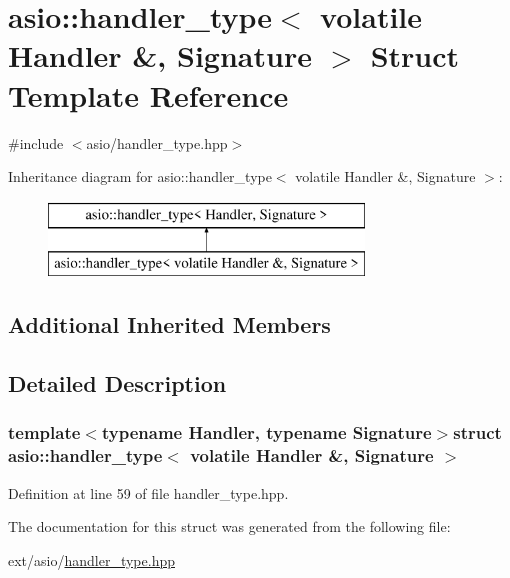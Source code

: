 \hypertarget{structasio_1_1handler__type_3_01volatile_01_handler_01_6_00_01_signature_01_4}{}\section{asio\+:\+:handler\+\_\+type$<$ volatile Handler \&, Signature $>$ Struct Template Reference}
\label{structasio_1_1handler__type_3_01volatile_01_handler_01_6_00_01_signature_01_4}


{\ttfamily \#include $<$asio/handler\+\_\+type.\+hpp$>$}

Inheritance diagram for asio\+:\+:handler\+\_\+type$<$ volatile Handler \&, Signature $>$\+:\begin{figure}[H]
\begin{center}
\leavevmode
\includegraphics[height=2.000000cm]{structasio_1_1handler__type_3_01volatile_01_handler_01_6_00_01_signature_01_4}
\end{center}
\end{figure}
\subsection*{Additional Inherited Members}


\subsection{Detailed Description}
\subsubsection*{template$<$typename Handler, typename Signature$>$struct asio\+::handler\+\_\+type$<$ volatile Handler \&, Signature $>$}



Definition at line 59 of file handler\+\_\+type.\+hpp.



The documentation for this struct was generated from the following file\+:\begin{DoxyCompactItemize}
\item 
ext/asio/\hyperlink{handler__type_8hpp}{handler\+\_\+type.\+hpp}\end{DoxyCompactItemize}
